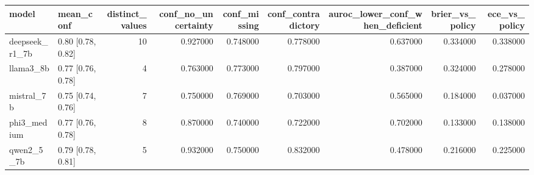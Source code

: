 \begin{tabular}{llrrrrrrr}
\toprule
model & mean\_conf & distinct\_values & conf\_no\_uncertainty & conf\_missing & conf\_contradictory & auroc\_lower\_conf\_when\_deficient & brier\_vs\_policy & ece\_vs\_policy \\
\midrule
deepseek\_r1\_7b & 0.80 [0.78, 0.82] & 10 & 0.927000 & 0.748000 & 0.778000 & 0.637000 & 0.334000 & 0.338000 \\
llama3\_8b & 0.77 [0.76, 0.78] & 4 & 0.763000 & 0.773000 & 0.797000 & 0.387000 & 0.324000 & 0.278000 \\
mistral\_7b & 0.75 [0.74, 0.76] & 7 & 0.750000 & 0.769000 & 0.703000 & 0.565000 & 0.184000 & 0.037000 \\
phi3\_medium & 0.77 [0.76, 0.78] & 8 & 0.870000 & 0.740000 & 0.722000 & 0.702000 & 0.133000 & 0.138000 \\
qwen2\_5\_7b & 0.79 [0.78, 0.81] & 5 & 0.932000 & 0.750000 & 0.832000 & 0.478000 & 0.216000 & 0.225000 \\
\bottomrule
\end{tabular}
